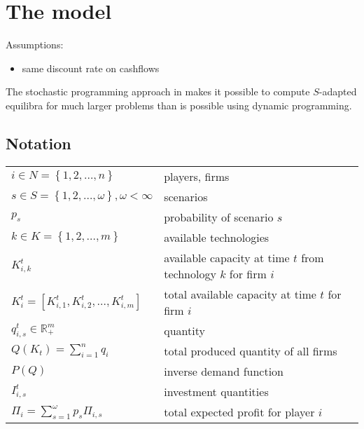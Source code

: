 \section{The model}

Assumptions:

\begin{itemize}
	\item same discount rate on cashflows
\end{itemize}

The stochastic programming approach in \cite{Genc2007} makes it possible to compute $S$-adapted equilibra for much larger problems than is possible using dynamic programming.

\subsection{Notation}

\begin{longtable}[c]{l l}
$i\in N=\left\{ 1,2,\dots,n\right\}$                           & players, firms\\
$s\in S=\left\{ 1,2,\dots,\omega\right\}, \omega<\infty$       & scenarios\\
$p_s$                                                          & probability of scenario $s$\\
$k\in K=\left\{ 1,2,\dots,m\right\}$                           & available technologies\\
$K_{i,k}^t$                                                     & available capacity at time $t$ from technology $k$ for firm $i$\\
$K_i^t=\left[K_{i,1}^t,K_{i,2}^t,\dots,K_{i,m}^t\right]$                                    & total available capacity at time $t$ for firm $i$\\
$q_{i,s}^t\in\mathbb{R}_+^m$                                                     & quantity\\
$Q(K_t)=\sum_{i=1}^nq_i$                                        & total produced quantity of all firms\\
$P(Q)$                                                         & inverse demand function\\

$I_{i,s}^t$                                                     & investment quantities\\
$\Pi_i=\sum_{s=1}^\omega p_s\Pi_{i,s}$                            & total expected profit for player $i$
\end{longtable}

